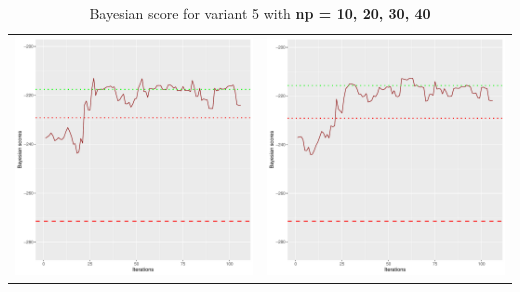 \documentclass[]{scrartcl}
\begin{document}
\begin{table}[h!]
\begin{tabular}{cc}
\includegraphics[scale = 0.4]{./figs/asia/v5/30/bayBoundsEvolution-107.pdf} & 
\includegraphics[scale = 0.4]{./figs/asia/v5/40/bayBoundsEvolution-107.pdf} \\
\end{tabular}
\caption{Bayesian score for variant 5 with \textbf{np =  10, 20, 30, 40}}
\end{table}
\end{document}
